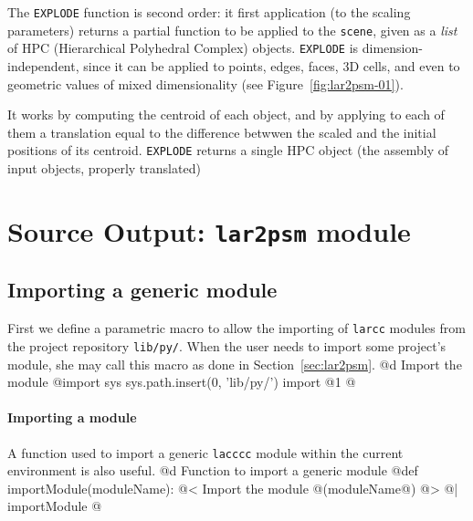 \documentclass[11pt,oneside]{article}	%
\begin{document}
The \texttt{EXPLODE} function is second order: it first application (to the scaling parameters) returns a partial function to be applied to the \texttt{scene}, given as a \emph{list} of HPC (Hierarchical Polyhedral Complex) objects. 
\texttt{EXPLODE} is dimension-independent, since it can be applied to points, edges, faces, 3D cells, and even to geometric values of mixed dimensionality (see Figure~\ref{fig:lar2psm-01}).

It works by computing the centroid of each object, and by applying to each of them a translation equal to the difference betwwen the scaled and the initial positions of its centroid. 
\texttt{EXPLODE}  returns a single HPC object (the assembly of input objects, properly translated)

\section{Source Output: \texttt{lar2psm} module}


\subsection{Importing a generic module}
First we define a parametric macro to allow the importing of \texttt{larcc} modules from the project repository \texttt{lib/py/}. When the user needs to import some project's module, she may call this macro as done in Section~\ref{sec:lar2psm}.
@d Import the module
@{import sys
sys.path.insert(0, 'lib/py/')
import @1
@}

\paragraph{Importing a module} A function used to import a generic \texttt{lacccc} module within the current environment is also useful.
@d Function to import a generic module
@{def importModule(moduleName):
	@< Import the module @(moduleName@) @>
@| importModule @}
\end{document}
